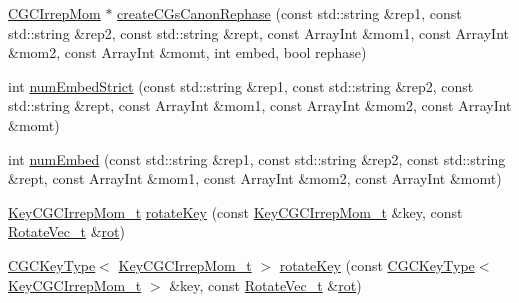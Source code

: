 \begin{DoxyCompactItemize}
\item 
\mbox{\hyperlink{classHadron_1_1CGCIrrepMom}{C\+G\+C\+Irrep\+Mom}} $\ast$ \mbox{\hyperlink{namespaceHadron_1_1CGC_a47b736ab1ac22edb39f4b0df589a7053}{create\+C\+Gs\+Canon\+Rephase}} (const std\+::string \&rep1, const std\+::string \&rep2, const std\+::string \&rept, const Array\+Int \&mom1, const Array\+Int \&mom2, const Array\+Int \&momt, int embed, bool rephase)
\item 
int \mbox{\hyperlink{namespaceHadron_1_1CGC_af5aac6c0d70eb7159aa635525bac7629}{num\+Embed\+Strict}} (const std\+::string \&rep1, const std\+::string \&rep2, const std\+::string \&rept, const Array\+Int \&mom1, const Array\+Int \&mom2, const Array\+Int \&momt)
\item 
int \mbox{\hyperlink{namespaceHadron_1_1CGC_af727ac6be27b471bc40b4696c2a29cdb}{num\+Embed}} (const std\+::string \&rep1, const std\+::string \&rep2, const std\+::string \&rept, const Array\+Int \&mom1, const Array\+Int \&mom2, const Array\+Int \&momt)
\item 
\mbox{\hyperlink{structHadron_1_1KeyCGCIrrepMom__t}{Key\+C\+G\+C\+Irrep\+Mom\+\_\+t}} \mbox{\hyperlink{namespaceHadron_1_1CGC_acdc26e4dd88e281dc6675da8d6d1b13d}{rotate\+Key}} (const \mbox{\hyperlink{structHadron_1_1KeyCGCIrrepMom__t}{Key\+C\+G\+C\+Irrep\+Mom\+\_\+t}} \&key, const \mbox{\hyperlink{structHadron_1_1RotateVec__t}{Rotate\+Vec\+\_\+t}} \&\mbox{\hyperlink{rot__mat_8cc_a1db2ab3d82c6029ee441423308802a74}{rot}})
\item 
\mbox{\hyperlink{structHadron_1_1CGCKeyType}{C\+G\+C\+Key\+Type}}$<$ \mbox{\hyperlink{structHadron_1_1KeyCGCIrrepMom__t}{Key\+C\+G\+C\+Irrep\+Mom\+\_\+t}} $>$ \mbox{\hyperlink{namespaceHadron_1_1CGC_ad5f1f6f8b8dd82238f3efeb03d1dc6e5}{rotate\+Key}} (const \mbox{\hyperlink{structHadron_1_1CGCKeyType}{C\+G\+C\+Key\+Type}}$<$ \mbox{\hyperlink{structHadron_1_1KeyCGCIrrepMom__t}{Key\+C\+G\+C\+Irrep\+Mom\+\_\+t}} $>$ \&key, const \mbox{\hyperlink{structHadron_1_1RotateVec__t}{Rotate\+Vec\+\_\+t}} \&\mbox{\hyperlink{rot__mat_8cc_a1db2ab3d82c6029ee441423308802a74}{rot}})
\end{DoxyCompactItemize}
